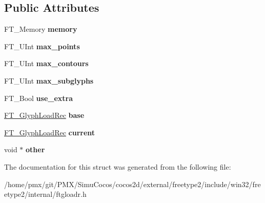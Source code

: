 \subsection*{Public Attributes}
\begin{DoxyCompactItemize}
\item 
\mbox{\label{structFT__GlyphLoaderRec___a9120a7808ee59d24dd52409e609907a2}} 
F\+T\+\_\+\+Memory {\bfseries memory}
\item 
\mbox{\label{structFT__GlyphLoaderRec___a62339fa7a06e0b4ddecd5db2aa606741}} 
F\+T\+\_\+\+U\+Int {\bfseries max\+\_\+points}
\item 
\mbox{\label{structFT__GlyphLoaderRec___a808ccf46597572d953f387e705f10a36}} 
F\+T\+\_\+\+U\+Int {\bfseries max\+\_\+contours}
\item 
\mbox{\label{structFT__GlyphLoaderRec___a2d5b00d7caf624ed2b4f6fd2db3228db}} 
F\+T\+\_\+\+U\+Int {\bfseries max\+\_\+subglyphs}
\item 
\mbox{\label{structFT__GlyphLoaderRec___a54009985acda32d83f2f124e28c5d00a}} 
F\+T\+\_\+\+Bool {\bfseries use\+\_\+extra}
\item 
\mbox{\label{structFT__GlyphLoaderRec___ae80dfc17f20bfce8c60ffaaba95c821b}} 
\hyperlink{structFT__GlyphLoadRec__}{F\+T\+\_\+\+Glyph\+Load\+Rec} {\bfseries base}
\item 
\mbox{\label{structFT__GlyphLoaderRec___a271b1b9604746ed08cf6613710ebb4c1}} 
\hyperlink{structFT__GlyphLoadRec__}{F\+T\+\_\+\+Glyph\+Load\+Rec} {\bfseries current}
\item 
\mbox{\label{structFT__GlyphLoaderRec___a81f204a21644460d1122fd2eca80ccba}} 
void $\ast$ {\bfseries other}
\end{DoxyCompactItemize}


The documentation for this struct was generated from the following file\+:\begin{DoxyCompactItemize}
\item 
/home/pmx/git/\+P\+M\+X/\+Simu\+Cocos/cocos2d/external/freetype2/include/win32/freetype2/internal/ftgloadr.\+h\end{DoxyCompactItemize}
